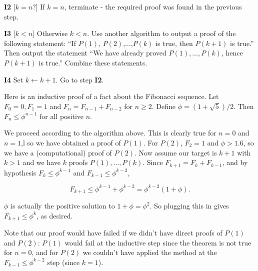\documentclass{article}
\begin{document}
\textbf{I2} [$k=n$?] If $k=n$, terminate - the required proof was found in the previous step.

\textbf{I3} [$k<n$] Otherwise $k<n$. Use another algorithm to output a proof of the following statement: ``If $P(1)$, $P(2)$,$\dots$,$P(k)$ is true, then $P(k+1)$ is true.'' Then output the statement ``We have already proved $P(1),\dots,P(k)$, hence $P(k+1)$ is true.'' Combine these statements.

\textbf{I4} Set $k \leftarrow k + 1$. Go to step \textbf{I2}.

Here is an inductive proof of a fact about the Fibonacci sequence. Let $F_0 = 0,F_1=1$ and $F_n = F_{n-1} + F_{n-2}$ for $n\geq 2$. Define $\phi = (1 + \sqrt{5})/2$. Then $F_n \leq \phi^{n-1}$ for all positive $n$.

We proceed according to the algorithm above. This is clearly true for $n=0$ and $n=1$,l so we have obtained a proof of $P(1)$. For $P(2)$, $F_2 = 1$ and $\phi > 1.6$, so we have a (computational) proof of $P(2)$. Now assume our target is $k+1$ with $k>1$ and we have $k$ proofs $P(1),\dots,P(k)$. Since $F_{k+1} = F_k + F_{k-1}$, and by hypothesis $F_k \leq \phi^{k-1}$ and $F_{k-1} \leq \phi^{k-2}$,

\begin{equation}
  F_{k+1} \leq \phi^{k-1} + \phi^{k-2} = \phi^{k-2}(1+\phi).
\end{equation}

$\phi$ is actually the positive solution to $1 + \phi = \phi^2$. So plugging this in gives $F_{k+1} \leq \phi^k$, as desired.

Note that our proof would have failed if we didn't have direct proofs of $P(1)$ and $P(2)$: $P(1)$ would fail at the inductive step since the theorem is not true for $n=0$, and for $P(2)$ we couldn't have applied the method at the $F_{k-1} \leq \phi^{k-2}$ step (since $k=1$).
\end{document}

